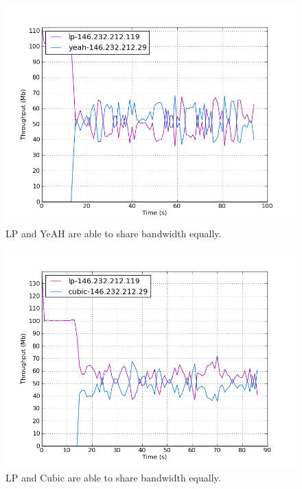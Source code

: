 \documentclass[11pt,a4paper,twocolumn]{article}
\begin{document}
\begin{figure}[p]
	\includegraphics[width=\linewidth]{exp38.png}
	\caption{LP and YeAH are able to share bandwidth equally.}
	\label{fig:lp_yeah}
\end{figure}

\begin{figure}[p]
	\includegraphics[width=\linewidth]{exp39.png}
	\caption{LP and Cubic are able to share bandwidth equally.}
	\label{fig:lp_cubic}
\end{figure}
\end{document}
